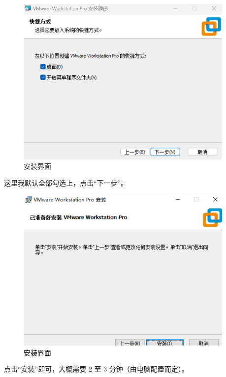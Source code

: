\documentclass[UTF8]{ctexart}
\begin{document}
\begin{figure}[H]
    \centering
    \includegraphics[width=0.95\textwidth]{picture/Screenshot 2024-10-14 105732.png}
    \caption{安装界面}
\end{figure}
这里我默认全部勾选上，点击“下一步”。

\begin{figure}[H]
    \centering
    \includegraphics[width=0.95\textwidth]{picture/Screenshot 2024-10-14 105829.png}
    \caption{安装界面}
\end{figure}
点击“安装”即可，大概需要 2 至 3 分钟（由电脑配置而定）。
\end{document}
